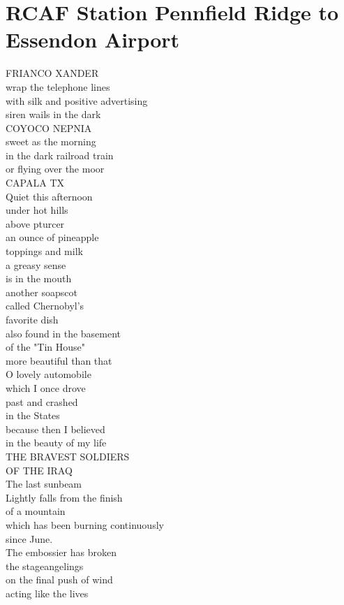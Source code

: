 \documentclass[smalldemyvopaper,11pt,twoside,onecolumn,openright,extrafontsizes]{memoir}
\begin{document}
\chapter{RCAF Station Pennfield Ridge to Essendon Airport}
FRIANCO XANDER
\\wrap the telephone lines
\\with silk and positive advertising
\\siren wails in the dark
\\COYOCO NEPNIA
\\sweet as the morning
\\in the dark railroad train
\\or flying over the moor
\\CAPALA TX
\\Quiet this afternoon
\\under hot hills
\\above pturcer
\\an ounce of pineapple
\\toppings and milk
\\a greasy sense
\\is in the mouth
\\another soapscot
\\called Chernobyl's
\\favorite dish
\\also found in the basement
\\of the "Tin House"
\\more beautiful than that
\\O lovely automobile
\\which I once drove
\\past and crashed
\\in the States
\\because then I believed
\\in the beauty of my life
\\THE BRAVEST SOLDIERS
\\OF THE IRAQ
\\The last sunbeam
\\Lightly falls from the finish
\\of a mountain
\\which has been burning continuously
\\since June.
\\The embossier has broken
\\the stageangelings
\\on the final push of wind
\\acting like the lives
\end{document}

